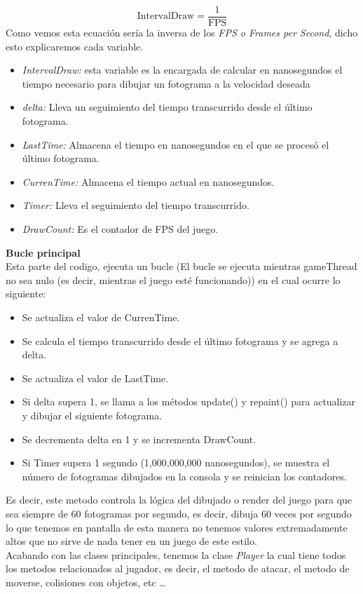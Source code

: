 \documentclass[a4paper]{article}
\begin{document}
$$\text{IntervalDraw} = \frac{1}{\text{FPS}}$$
Como vemos esta ecuación sería la inversa de los \textit{FPS o Frames per Second}, dicho esto explicaremos cada variable.
\begin{itemize}
    \item \textit{IntervalDraw:} esta variable es la encargada de calcular en nanosegundos el tiempo necesario para dibujar un fotograma a la velocidad deseada
    \item \textit{delta:} Lleva un seguimiento del tiempo transcurrido desde el último fotograma.
    \item \textit{LastTime:} Almacena el tiempo en nanosegundos en el que se procesó el último fotograma.
    \item \textit{CurrenTime:} Almacena el tiempo actual en nanosegundos.
    \item \textit{Timer:} Lleva el seguimiento del tiempo transcurrido.
    \item \textit{DrawCount:} Es el contador de FPS del juego.
\end{itemize}
\textbf{Bucle principal}\\
Esta parte del codigo, ejecuta un bucle (El bucle se ejecuta mientras gameThread no sea nulo (es decir, mientras el juego esté funcionando)) en el cual ocurre lo siguiente:
\begin{itemize}
    \item Se actualiza el valor de CurrenTime.
    \item Se calcula el tiempo transcurrido desde el último fotograma y se agrega a delta.
    \item Se actualiza el valor de LastTime.
    \item Si delta supera 1, se llama a los métodos update() y repaint() para actualizar y dibujar el siguiente fotograma.
    \item Se decrementa delta en 1 y se incrementa DrawCount.
    \item Si Timer supera 1 segundo (1,000,000,000 nanosegundos), se muestra el número de fotogramas dibujados en la consola y se reinician los contadores.
\end{itemize}
Es decir, este metodo controla la lógica del dibujado o render del juego para que sea siempre de 60 fotogramas por segundo, es decir, dibuja 60 veces por segundo lo que tenemos en pantalla
de esta manera no tenemos valores extremadamente altos que no sirve de nada tener en un juego de este estilo.\\
Acabando con las clases principales, tenemos la clase \textit{Player} la cual tiene todos los metodos relacionados al jugador, es decir, el metodo de atacar, el metodo de moverse, colisiones con objetos,
etc \dots
\clearpage
\end{document}
